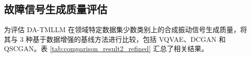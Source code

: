 \subsection{故障信号生成质量评估}\label{subsec:DA-TMLLM_signal_generation_quality_evaluation}

为评估 DA-TMLLM 在领域特定数据集少数类别上的合成振动信号生成质量，将其与 3 种基于数据增强的基线方法进行比较，包括 VQVAE、DCGAN 和 QSCGAN。表 \ref{tab:comparison_result2_refined} 汇总了相关结果。






